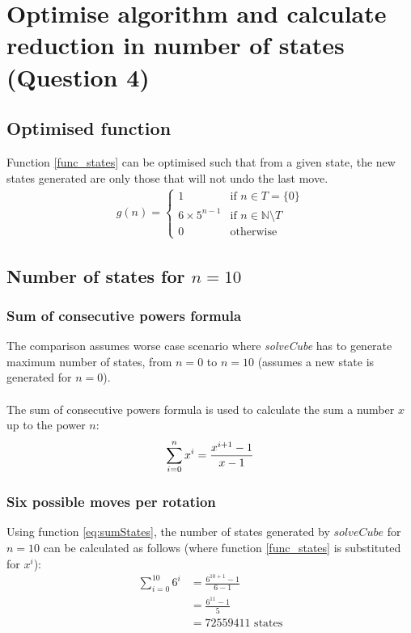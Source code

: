 \documentclass[]{article}
\begin{document}
\section{Optimise algorithm and calculate reduction in number of states (Question 4)}
\subsection{Optimised function}							
Function \ref{func_states} can be optimised such that from a given state, the new states generated are only those that will not undo the last move.
\begin{equation}
\begin{split}
g(n) =
\begin{cases}
	1 & \text{if }n \in T = \{0\}\\
	6 \times 5^{n-1} & \text{if }n \in \mathbb{N} \setminus T\\
	0 & \text{otherwise}
\end{cases}
\end{split}
\label{fun:func_states_optimised}
\end{equation}
\subsection{Number of states for \(n = 10\)}
\subsubsection{Sum of consecutive powers formula}
The comparison assumes worse case scenario where \textit{solveCube} has to generate maximum number of states, from \(n = 0\) to \(n = 10\) (assumes a new state is generated for \(n = 0\)).
\\\\The sum of consecutive powers formula is used to calculate the sum a number \(x\) up to the power \(n\): 
\begin{equation}
\sum_{i=0}^{n}x^i = \frac{x^{i+1} - 1}{x - 1} \\
\label{eq:sumStates}
\end{equation}
\subsubsection{Six possible moves per rotation}
Using function \ref{eq:sumStates}, the number of states generated by \(solveCube\) for \(n = 10\) can be calculated as follows (where function \ref{func_states} is substituted for \(x^i\)):
\begin{equation*}
\begin{split}
\sum_{i=0}^{10}6^i & = \frac{6^{10+1} - 1}{6 - 1} \\
& = \frac{6^{11} - 1}{5} \\
& = 72559411\text{ states}
\end{split}
\end{equation*}
\end{document}
